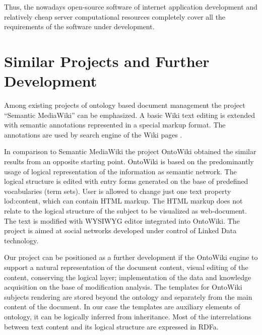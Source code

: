 \documentclass[conference]{IEEEtran}
\begin{document}
Thus, the nowadays open-source software of internet application development and relatively cheap server computational resources completely cover all the requirements of the software under development.

\section{Similar Projects and Further Development}
\label{sec:similar-projects}

Among existing projects of ontology based document management the project “Semantic MediaWiki” can be emphasized. A basic Wiki text editing is extended with semantic annotations represented in a special markup format. The annotations are used by search engine of the Wiki pages \cite{mediawiki}.

In comparison to Semantic MediaWiki the project OntoWiki \cite{heino} obtained the similar results from an opposite starting point. OntoWiki is based on the predominantly usage of logical representation of the information as semantic network. The logical structure is edited with entry forms generated on the base of predefined vocabularies (term sets). User is allowed to change just one text property lod:content, which can contain HTML markup. The HTML markup does not relate to the logical structure of the subject to be visualized as web-document. The text is modified with WYSIWYG editor integrated into OntoWiki. The project is aimed at social networks developed under control of Linked Data technology.

Our project can be positioned as a further development if the OntoWiki engine to support a natural representation of the document content, visual editing of the content, conserving the logical layer; implementation of the data and knowledge acquisition on the base of modification analysis. The templates for OntoWiki subjects rendering are stored beyond the ontology and separately from the main content of the document. In our case the templates are auxiliary elements of ontology, it can be logically inferred from inheritance. Most of the interrelations between text content and its logical structure are expressed in RDFa.
\end{document}

